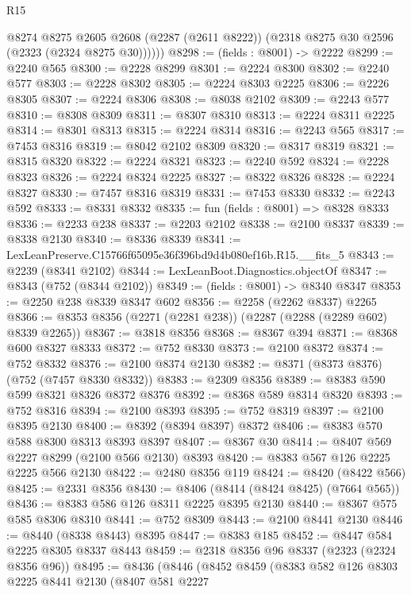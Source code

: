 \begin{lexlean}{R15}
\begin{coremodule}
        @8274
          @8275
          @2605
          @2608
          (@2287 (@2611 @8222))
          (@2318 @8275 @30 @2596 (@2323 (@2324 @8275 @30))))))
@8298 := (fields : @8001) -> @2222
@8299 := @2240 @565
@8300 := @2228 @8299
@8301 := @2224 @8300
@8302 := @2240 @577
@8303 := @2228 @8302
@8305 := @2224 @8303 @2225
@8306 := @2226 @8305
@8307 := @2224 @8306
@8308 := @8038 @2102
@8309 := @2243 @577
@8310 := @8308 @8309
@8311 := @8307 @8310
@8313 := @2224 @8311 @2225
@8314 := @8301 @8313
@8315 := @2224 @8314
@8316 := @2243 @565
@8317 := @7453 @8316
@8319 := @8042 @2102 @8309
@8320 := @8317 @8319
@8321 := @8315 @8320
@8322 := @2224 @8321
@8323 := @2240 @592
@8324 := @2228 @8323
@8326 := @2224 @8324 @2225
@8327 := @8322 @8326
@8328 := @2224 @8327
@8330 := @7457 @8316 @8319
@8331 := @7453 @8330
@8332 := @2243 @592
@8333 := @8331 @8332
@8335 := fun (fields : @8001) => @8328 @8333
@8336 := @2233 @238
@8337 := @2203 @2102
@8338 := @2100 @8337
@8339 := @8338 @2130
@8340 := @8336 @8339
@8341 := LexLeanPreserve.C15766f65095e36f396bd9d4b080ef16b.R15.__fits_5
@8343 := @2239 (@8341 @2102)
@8344 := LexLeanBoot.Diagnostics.objectOf
@8347 := @8343 (@752 (@8344 @2102))
@8349 := (fields : @8001) -> @8340 @8347
@8353 := @2250 @238 @8339 @8347 @602
@8356 := @2258 (@2262 @8337) @2265
@8366 := @8353 @8356 (@2271 (@2281 @238)) (@2287 (@2288 (@2289 @602) @8339 @2265))
@8367 := @3818 @8356
@8368 := @8367 @394
@8371 := @8368 @600 @8327 @8333
@8372 := @752 @8330
@8373 := @2100 @8372
@8374 := @752 @8332
@8376 := @2100 @8374 @2130
@8382 := @8371 (@8373 @8376) (@752 (@7457 @8330 @8332))
@8383 := @2309 @8356
@8389 := @8383 @590 @599 @8321 @8326 @8372 @8376
@8392 := @8368 @589 @8314 @8320
@8393 := @752 @8316
@8394 := @2100 @8393
@8395 := @752 @8319
@8397 := @2100 @8395 @2130
@8400 := @8392 (@8394 @8397) @8372
@8406 := @8383 @570 @588 @8300 @8313 @8393 @8397
@8407 := @8367 @30
@8414 := @8407 @569 @2227 @8299 (@2100 @566 @2130) @8393
@8420 := @8383 @567 @126 @2225 @2225 @566 @2130
@8422 := @2480 @8356 @119
@8424 := @8420 (@8422 @566)
@8425 := @2331 @8356
@8430 := @8406 (@8414 (@8424 @8425) (@7664 @565))
@8436 := @8383 @586 @126 @8311 @2225 @8395 @2130
@8440 := @8367 @575 @585 @8306 @8310
@8441 := @752 @8309
@8443 := @2100 @8441 @2130
@8446 := @8440 (@8338 @8443) @8395
@8447 := @8383 @185
@8452 := @8447 @584 @2225 @8305 @8337 @8443
@8459 := @2318 @8356 @96 @8337 (@2323 (@2324 @8356 @96))
@8495 := @8436
    (@8446
      (@8452
        @8459
        (@8383
          @582
          @126
          @8303
          @2225
          @8441
          @2130
          (@8407
            @581
            @2227

\end{coremodule}
\end{lexlean}
